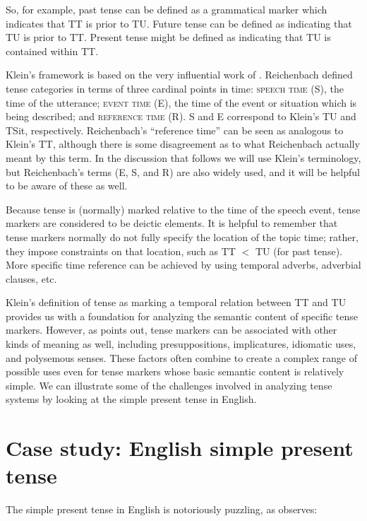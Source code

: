 So, for example, past tense can be defined as a grammatical marker which indicates that TT is prior to TU. Future tense can be defined as indicating that TU is prior to TT. Present tense might be defined as indicating that TU is contained within TT.


\largerpage
Klein’s framework is based on the very influential work of \citet{Reichenbach1947}. Reichenbach defined tense categories in terms of three cardinal points in time: \textsc{speech time} (S), the time of the utterance; \textsc{event time} (E), the time of the event or situation which is being described; and \textsc{reference time} (R). S and E correspond to Klein’s TU and TSit, respectively. Reichenbach’s “reference time” can be seen as analogous to Klein’s TT, although there is some disagreement as to what Reichenbach actually meant by this term. In the discussion that follows we will use Klein’s terminology, but Reichenbach’s terms (E, S, and R) are also widely used, and it will be helpful to be aware of these as well.



Because tense is (normally) marked relative to the time of the speech event, tense markers are considered to be deictic elements. It is helpful to remember that tense markers normally do not fully specify the location of the topic time; rather, they impose constraints on that location, such as TT {$<$} TU (for past tense). More specific time reference can be achieved by using temporal adverbs, adverbial clauses, etc.



Klein’s definition of tense as marking a temporal relation between TT and TU provides us with a foundation for analyzing the semantic content of specific tense markers. However, as \citet[26--29, 54--55]{Comrie1985} points out, tense markers can be associated with other kinds of meaning as well, including presuppositions, implicatures, idiomatic uses, and polysemous senses. These factors often combine to create a complex range of possible uses even for tense markers whose basic semantic content is relatively simple. We can illustrate some of the challenges involved in analyzing tense systems by looking at the simple present tense in English.


\section{Case study: English simple present tense}\label{sec:21.3}

The simple present tense in English is notoriously puzzling, as \citet{Langacker2001} observes:


